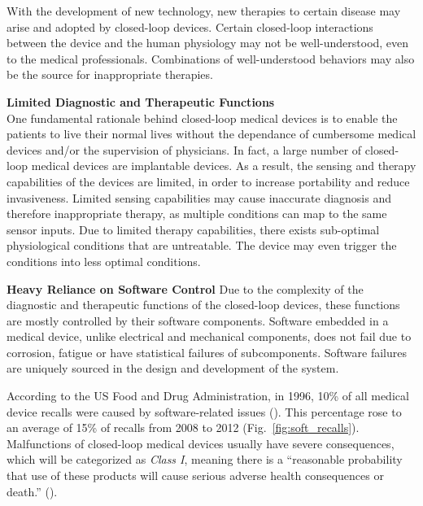 \documentclass[a4paper]{article}
\newcommand{\figref}[1]{Fig.~\ref{fig:#1}}
\begin{document}
With the development of new technology, new therapies to certain disease may arise and adopted by closed-loop devices. Certain closed-loop interactions between the device and the human physiology may not be well-understood, even to the medical professionals. Combinations of well-understood behaviors may also be the source for inappropriate therapies. 

\textbf{Limited Diagnostic and Therapeutic Functions}\\
One fundamental rationale behind closed-loop medical devices is to enable the patients to live their normal lives without the dependance of cumbersome medical devices and/or the supervision of physicians. In fact, a large number of closed-loop medical devices are implantable devices. As a result, the sensing and therapy capabilities of the devices are limited, in order to increase portability and reduce invasiveness. Limited sensing capabilities may cause inaccurate diagnosis and therefore inappropriate therapy, as multiple conditions can map to the same sensor inputs. Due to limited therapy capabilities, there exists sub-optimal physiological conditions that are untreatable. The device may even trigger the conditions into less optimal conditions. 

\textbf{Heavy Reliance on Software Control}
Due to the complexity of the diagnostic and therapeutic functions of the closed-loop devices, these functions are mostly controlled by their software components. 
Software embedded in a medical device, unlike electrical and mechanical components, does not fail due to corrosion, fatigue or have statistical failures of subcomponents. Software failures are uniquely sourced in the design and development of the system. %

According to the US Food and Drug Administration, in 1996, 10\% of all medical device recalls were caused by software-related issues (\cite{medstats}). This percentage rose to an average of 15\% of recalls from 2008 to 2012 (\figref{soft_recalls}). Malfunctions of closed-loop medical devices usually have severe consequences, which will be categorized as \emph{Class I}, meaning there is a ``reasonable probability that use of these products will cause serious adverse health consequences or death.'' (\cite{medstats2,pacemakerrecalls,killedbycode}). 
	
\end{document}
